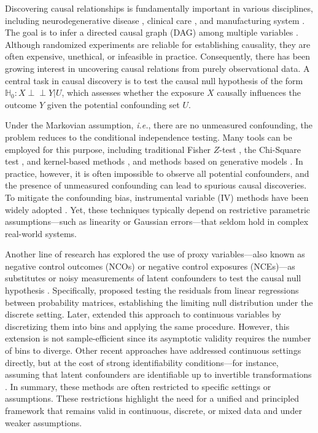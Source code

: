 \documentclass[
  12pt]{article}
\newcommand{\ind}{\perp\!\!\!\!\perp}
\def\mH{\mathbb{H}}
\begin{document}
Discovering causal relationships is fundamentally important in various disciplines, including neurodegenerative disease \citep{young2018uncovering}, clinical care \citep{khetan2021mimicause}, and manufacturing system \citep{marazopoulou2016causal}. The goal is to infer a directed causal graph (DAG) among multiple variables \citep{pearl2009causality,spirtes2001causation}. Although randomized experiments are reliable for establishing causality, they are often expensive, unethical, or infeasible in practice. Consequently, there has been growing interest in uncovering causal relations from purely observational data. A central task in causal discovery is to test the causal null hypothesis \citep{miao2018identifying} of the form $\mH_0: X \ind Y|U$, which assesses whether the exposure $X$ causally influences the outcome $Y$
given the potential confounding set $U$.


Under the Markovian assumption, \emph{i.e.}, there are no unmeasured confounding, the problem reduces to the conditional independence testing. Many tools can be employed for this purpose, including traditional Fisher $Z$-test \citep{fisher1921probable}, the Chi-Square test \citep{tallarida1987chi}, and kernel-based methods \citep{fukumizu2007kernel,zhang2012kernel,cai2022distribution}, and methods based on generative models \citep{bellot2019conditional, shi2021double}. In practice, however, it is often impossible to observe all potential confounders, and the presence of unmeasured confounding can lead to spurious causal discoveries. To mitigate the confounding bias, instrumental variable (IV) methods have been widely adopted \citep{davey2014mendelian, lousdal2018introduction, xue2020inferring, chen2024discovery, li2024discovery}. Yet, these techniques typically depend on restrictive parametric assumptions—such as linearity or Gaussian errors—that seldom hold in complex real-world systems.



Another line of research has explored the use of proxy variables—also known as negative control outcomes (NCOs) or negative control exposures (NCEs)—as substitutes or noisy measurements of latent confounders to test the causal null hypothesis \citep{kuroki2014measurement, miao2018identifying, liu2023causal, miao2023identifying, wubivariate}. Specifically, \citet{miao2018identifying} proposed testing the residuals from linear regressions between probability matrices, establishing the limiting null distribution under the discrete setting. Later, \citet{liu2023causal} extended this approach to continuous variables by discretizing them into bins and applying the same procedure. However, this extension is not sample-efficient since its asymptotic validity requires the number of bins to diverge. Other recent approaches \citep{miao2023identifying, wubivariate} have addressed continuous settings directly, but at the cost of strong identifiability conditions—for instance, assuming that latent confounders are identifiable up to invertible transformations \citep{miao2023identifying}. In summary, these methods are often restricted to specific settings or assumptions. These restrictions highlight the need for a unified and principled framework that remains valid in continuous, discrete, or mixed data and under weaker assumptions.
\end{document}
